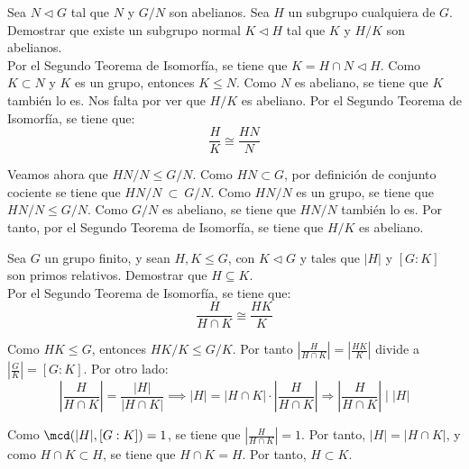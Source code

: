 \begin{ejercicio}
    Sea $N\lhd G$ tal que $N$ y $G/N$ son abelianos. Sea $H$ un subgrupo cualquiera de $G$. Demostrar que existe un subgrupo normal $K\lhd H$ tal que $K$ y $H/K$ son abelianos.\\

    Por el Segundo Teorema de Isomorfía, se tiene que $K=H\cap N\lhd H$. Como $K\subset N$ y $K$ es un grupo, entonces $K\leq N$. Como $N$ es abeliano, se tiene que $K$ también lo es. Nos falta por ver que $H/K$ es abeliano. Por el Segundo Teorema de Isomorfía, se tiene que:
    \begin{equation*}
        \dfrac{H}{K} \cong \dfrac{HN}{N}
    \end{equation*}

    Veamos ahora que $HN/N\leq G/N$. Como $HN\subset G$, por definición de conjunto cociente se tiene que $HN/N \ \subset\ G/N$. Como $HN/N$ es un grupo, se tiene que $HN/N\leq G/N$. Como $G/N$ es abeliano, se tiene que $HN/N$ también lo es. Por tanto, por el Segundo Teorema de Isomorfía, se tiene que $H/K$ es abeliano.
\end{ejercicio}

\begin{ejercicio}
    Sea $G$ un grupo finito, y sean $H,K\leq G$, con $K\lhd G$ y tales que $|H|$ y $[G:K]$ son primos relativos. Demostrar que $H\subseteq K$.\\

    Por el Segundo Teorema de Isomorfía, se tiene que:
    \begin{equation*}
        \dfrac{H}{H\cap K} \cong \dfrac{HK}{K}
    \end{equation*}

    Como $HK\leq G$, entonces $HK/K \leq G/K$. Por tanto $\left|\frac{H}{H\cap K}\right| = \left|\frac{HK}{K}\right|$ divide a $\left|\frac{G}{K}\right| = [G:K]$. Por otro lado:
    \begin{equation*}
        \left|\frac{H}{H\cap K}\right| = \dfrac{|H|}{|H\cap K|} \implies |H| = |H\cap K|\cdot \left|\frac{H}{H\cap K}\right|\Longrightarrow \left|\frac{H}{H\cap K}\right| \mid |H|
    \end{equation*}

    Como $\mcd(|H|,[G:K])=1$, se tiene que $\left|\frac{H}{H\cap K}\right|=1$. Por tanto, $|H|=|H\cap K|$, y como $H\cap K\subset H$, se tiene que $H\cap K=H$. Por tanto, $H\subset K$.
\end{ejercicio}

